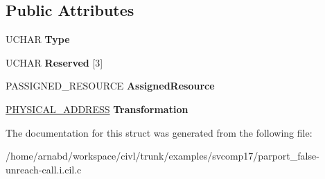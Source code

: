 \subsection*{Public Attributes}
\begin{DoxyCompactItemize}
\item 
\hypertarget{struct____anonstruct__SubAllocateFrom__33_ad93e2a672a37ef434c14845f420fdbd7}{}U\+C\+H\+A\+R {\bfseries Type}\label{struct____anonstruct__SubAllocateFrom__33_ad93e2a672a37ef434c14845f420fdbd7}

\item 
\hypertarget{struct____anonstruct__SubAllocateFrom__33_a8bbf7591bebcd2cb837c583637bb0f96}{}U\+C\+H\+A\+R {\bfseries Reserved} \mbox{[}3\mbox{]}\label{struct____anonstruct__SubAllocateFrom__33_a8bbf7591bebcd2cb837c583637bb0f96}

\item 
\hypertarget{struct____anonstruct__SubAllocateFrom__33_a1e290ed86f5761f135d15cc3f2b6e9a9}{}P\+A\+S\+S\+I\+G\+N\+E\+D\+\_\+\+R\+E\+S\+O\+U\+R\+C\+E {\bfseries Assigned\+Resource}\label{struct____anonstruct__SubAllocateFrom__33_a1e290ed86f5761f135d15cc3f2b6e9a9}

\item 
\hypertarget{struct____anonstruct__SubAllocateFrom__33_a21928776bc9b33c7359e4c51b43f7103}{}\hyperlink{union__LARGE__INTEGER}{P\+H\+Y\+S\+I\+C\+A\+L\+\_\+\+A\+D\+D\+R\+E\+S\+S} {\bfseries Transformation}\label{struct____anonstruct__SubAllocateFrom__33_a21928776bc9b33c7359e4c51b43f7103}

\end{DoxyCompactItemize}


The documentation for this struct was generated from the following file\+:\begin{DoxyCompactItemize}
\item 
/home/arnabd/workspace/civl/trunk/examples/svcomp17/parport\+\_\+false-\/unreach-\/call.\+i.\+cil.\+c\end{DoxyCompactItemize}
